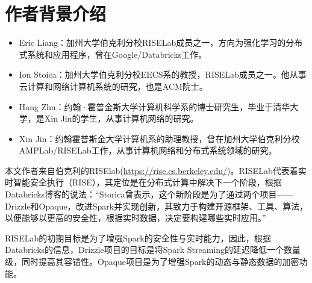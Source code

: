 \documentclass[UTF8,a4paper]{ctexart}
\begin{document}
\section{作者背景介绍}
\begin{itemize}
    \item Eric Liang：加州大学伯克利分校RISELab成员之一，方向为强化学习的分布式系统和应用程序，曾在Google/Databricks工作。
    \item Ion Stoica：加州大学伯克利分校EECS系的教授，RISELab成员之一。他从事云计算和网络计算机系统的研究，也是ACM院士。
    \item Hang Zhu：约翰·霍普金斯大学计算机科学系的博士研究生，毕业于清华大学，是Xin Jin的学生，从事计算机网络的研究。
    \item Xin Jin：约翰霍普斯金大学计算机系的助理教授，曾在加州大学伯克利分校AMPLab/RISELab工作，从事计算机网络和分布式系统领域的研究。
\end{itemize}
本文作者来自伯克利的RISElab(\url{https://rise.cs.berkeley.edu/})。RISELab代表着实时智能安全执行（RISE），其定位是在分布式计算中解决下一个阶段，根据Databricks博客的说法：“Storica曾表示，这个新阶段是为了通过两个项目——Drizzle和Opaque，改进Spark并实现创新，其致力于构建开源框架、工具、算法，以便能够以更高的安全性，根据实时数据，决定要构建哪些实时应用。”

RISELab的初期目标是为了增强Spark的安全性与实时能力，因此，根据Databricks的信息，Drizzle项目的目标是将Spark Streaming的延迟降低一个数量级，同时提高其容错性。Opaque项目是为了增强Spark的动态与静态数据的加密功能。

\clearpage
\end{document}
